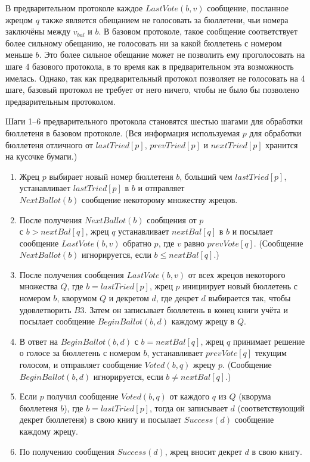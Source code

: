 \documentclass[12pt, a4paper]{article} %
\begin{document}
В предварительном протоколе каждое $LastVote(b, v)$ сообщение, посланное жрецом $q$ также является обещанием не голосовать за бюллетени, чьи номера заключёны между $v_{bal}$ и $b$. В базовом протоколе, такое сообщение соответствует более сильному обещанию, не голосовать ни за какой бюллетень с номером меньше $b$. Это более сильное обещание может не позволить ему проголосовать на шаге 4 базового протокола, в то время как в предварительном эта возможность имелась. Однако, так как предварительный протокол позволяет не голосовать на 4 шаге, базовый протокол не требует от него ничего, чтобы не было бы позволено предварительным протоколом.

Шаги 1--6 предварительного протокола становятся шестью шагами для обработки бюллетеня в базовом протоколе. (Вся информация используемая $p$ для обработки бюллетеня отличного от $lastTried[p]$, $prevTried[p]$ и $nextTried[p]$ хранится на кусочке бумаги.)

\begin{enumerate}
    \item Жрец $p$ выбирает новый номер бюллетеня $b$, больший чем $lastTried[p]$, устанавливает $lastTried[p]$ в $b$ и отправляет \\
    $NextBallot(b)$ сообщение некоторому множеству жрецов.
   
   \item После получения $NextBallot(b)$ сообщения от $p$\\
   с $b > nextBal[q]$, жрец $q$ устанавливает $nextBal[q]$ в $b$ и посылает сообщение $LastVote(b, v)$ обратно $p$, где $v$ равно $prevVote[q]$. (Сообщение $NextBallot(b)$ игнорируется, если $b \leqslant nextBal[q]$.)
   
   \item После получения сообщения $LastVote(b, v)$ от всех жрецов некоторого множества $Q$, где $b = lastTried[p]$, жрец $p$ инициирует новый бюллетень с номером $b$, кворумом $Q$ и декретом $d$, где декрет $d$ выбирается так, чтобы удовлетворить $B3$. Затем он записывает бюллетень в конец книги учёта и посылает сообщение $BeginBallot(b, d)$ каждому жрецу в $Q$.
   
   \item В ответ на $BeginBallot(b, d)$ с $b = nextBal[q]$, жрец $q$ принимает решение о голосе за бюллетень с номером $b$, устанавливает $prevVote[q]$ текущим голосом, и  отправляет сообщение $Voted(b, q)$ жрецу $p$. (Сообщение $BeginBallot(b, d)$ игнорируется, если $b \neq nextBal[q]$.)
    
    \item Если $p$ получил сообщение $Voted(b, q)$ от каждого $q$ из $Q$ (кворума бюллетеня $b$), где $b = lastTried[p]$, тогда он записывает $d$ (соответствующий декрет бюллетеня) в свою книгу и посылает $Success(d)$ сообщение каждому жрецу.

    \item По получению сообщения $Success(d)$, жрец вносит декрет $d$ в свою книгу.
\end{enumerate}
\end{document}
